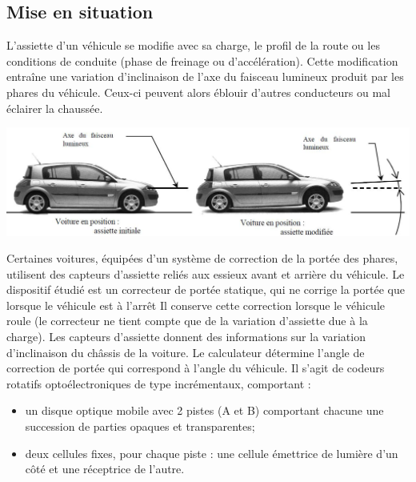 \documentclass[10pt,fleqn]{article} %
\begin{document}
\def\pathfig{images}

\vspace{4.5cm}
\pagestyle{fancy}
\thispagestyle{plain}

\def\columnseprulecolor{\color{ocre}}
\setlength{\columnseprule}{0.4pt} 

\def\pathfig{images}


\ifprof
\begin{multicols}{2}
\else
\begin{multicols}{2}
\fi

\subsection*{Mise en situation}


L’assiette d’un véhicule se modifie avec sa charge, le profil de la route ou les conditions de conduite (phase de freinage ou d’accélération). Cette modification entraîne une variation d’inclinaison de l’axe du faisceau lumineux produit par les phares du véhicule. Ceux-ci peuvent alors éblouir d’autres conducteurs ou mal éclairer la chaussée.

\begin{center}
\includegraphics[width=\linewidth]{images/fig_02.png}
\end{center}


Certaines voitures, équipées d’un système de correction de la portée des phares, utilisent des capteurs d’assiette reliés aux essieux avant et arrière du véhicule. Le dispositif étudié est un correcteur de portée statique, qui ne corrige la portée que lorsque le véhicule est à l’arrêt Il conserve cette correction lorsque le véhicule roule (le correcteur ne tient compte que de la variation d’assiette due à la charge).
Les capteurs d’assiette donnent des informations sur la variation d’inclinaison du châssis de la voiture. Le calculateur détermine l’angle de correction de portée qui correspond à l’angle du véhicule. Il s’agit de codeurs rotatifs optoélectroniques de type incrémentaux, comportant :
\begin{itemize}
\item un disque optique mobile avec 2 pistes (A et B) comportant chacune une succession de parties opaques et transparentes;
\item deux cellules fixes, pour chaque piste : une cellule émettrice de lumière d’un côté et une réceptrice de l’autre.
\end{itemize}


\end{multicols}
\end{multicols}
\end{document}
